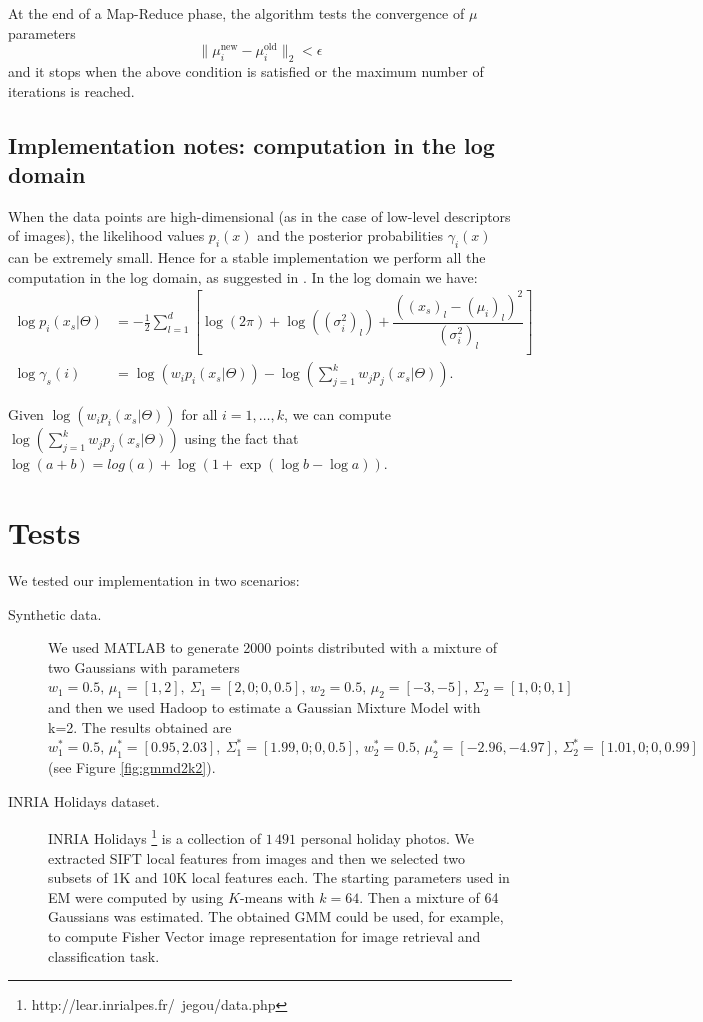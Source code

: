 \documentclass[a4paper,10pt]{article}
\begin{document}
At the end of a Map-Reduce phase, the algorithm tests the convergence of $\mu$ parameters
$$\|\mu_i^{\text{new}}-\mu_i^{\text{old}}\|_2<\epsilon$$ 
and it stops when the above condition is satisfied or the maximum number of iterations is reached.


\subsection{Implementation notes: computation in the log domain}
When the data points are high-dimensional (as in the case of low-level descriptors of images), the likelihood values $p_i(x)$ and the posterior probabilities $\gamma_i(x)$ can be extremely small. Hence for a stable implementation we perform all the computation in the log domain, as suggested in \cite{sanchez13}. 
In the log domain we have:
\begin{align}
\log p_i(x_s|\Theta)&=-\frac{1}{2}\sum_{l=1}^d\left[\log(2\pi)+  \log((\sigma^2_{i})_l) +  \dfrac{\left((x_{s})_l-(\mu_{i})_l\right)^2}{(\sigma^2_{i})_l }\right]\\
\log \gamma_s(i)&=\log \left(w_i  p_i(x_s|\Theta) \right )- \log \left( \sum _{j=1}^k w_j  p_j(x_s|\Theta)\right).
\end{align}

Given $\log \left(w_i  p_i(x_s|\Theta) \right )$ for all $i=1,\dots, k$,  we can compute $\log \left( \sum _{j=1}^k w_j  p_j(x_s|\Theta)\right)$ using the fact that
$\log(a+b)= log(a)+ \log\left(1+\exp(\log b- \log a) \right).$\\


\section{Tests}
We tested our implementation in two scenarios:
\begin{description}
	\item[Synthetic data.] We used MATLAB to generate 2000 points distributed with a mixture of two Gaussians with parameters $w_1=0.5,\, \mu_1=[1 , 2],\ \Sigma_1=[2, 0; 0, 0.5], \, w_2=0.5, \, \mu_2=[-3, -5], \,\Sigma_2=[1, 0; 0, 1]$ and then we used Hadoop to estimate a Gaussian Mixture Model with k=2. The results obtained are $w_1^*=0.5,\, \mu_1^*=[0.95 , 2.03],\ \Sigma_1^*=[1.99, 0; 0, 0.5], \, w_2^*=0.5, \, \mu_2^*=[-2.96,  -4.97], \,\Sigma_2^*=[1.01, 0; 0, 0.99]$ (see  Figure \ref{fig:gmmd2k2}). 
	\item[INRIA Holidays dataset.] INRIA Holidays \footnote{http://lear.inrialpes.fr/~jegou/data.php}
	is a collection of $1\,491$ personal holiday photos. We extracted SIFT local features from images and then we selected two subsets of 1K and 10K local features each. The starting parameters used in EM were computed by using $K$-means with $k=64$. Then a mixture of 64 Gaussians was estimated. The obtained GMM could be used, for example, to compute Fisher Vector \cite{sanchez13} image representation for image retrieval and classification task.
	
\end{description}
\end{document}
